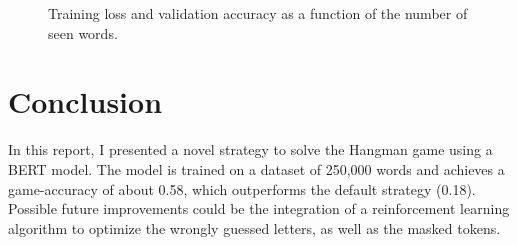 \documentclass{report}
\begin{document}
\begin{figure}[!h]
    \centering
    \caption{Training loss and validation accuracy as a function of the number of seen words.}
    \label{fig:fig4}
\end{figure}


\section*{Conclusion}
In this report, I presented a novel strategy to solve the Hangman game using a \ac{BERT} model.
The model is trained on a dataset of 250,000 words and achieves 
a game-accuracy of about 0.58, which outperforms the default strategy (0.18).
Possible future improvements could be the integration of a reinforcement learning algorithm to
optimize the wrongly guessed letters, as well as the masked tokens.
\end{document}
